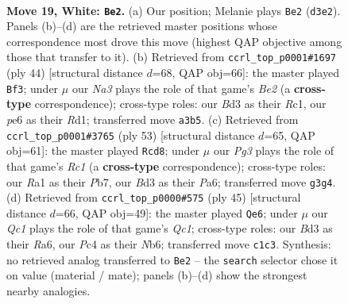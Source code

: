 \documentclass[11pt]{article}
\begin{document}
\clearpage

\begin{figure}[p]\centering
\begin{subfigure}{0.46\textwidth}\centering
\resizebox{\linewidth}{!}{%
\newchessgame
\chessboard[
  setfen={r3r1k1/pp5p/3bpqp1/3pn3/2P5/N2B2P1/PP3P1P/R1Q1R1K1 w - - 1 19},
  showmover=false,
  pgfstyle=straightmove, color=movearrow, markmove={d3-e2}
]}
\caption{}
\end{subfigure}\hfill
\begin{subfigure}{0.46\textwidth}\centering
\resizebox{\linewidth}{!}{%
\newchessgame
\chessboard[
  setfen={r2r2k1/3b1pp1/p6p/2p5/N2Pnq2/1P5P/PQ2BPP1/2RR2K1 w - - 1 23},
  showmover=false,
  pgfstyle=straightmove, color=movearrow, markmove={e2-f3}
]}
\caption{}
\end{subfigure}
\\[4pt]
\begin{subfigure}{0.46\textwidth}\centering
\resizebox{\linewidth}{!}{%
\newchessgame
\chessboard[
  setfen={2r2r1k/1pq4p/p4n2/P1p5/2B2p2/1Q2bPP1/1P2N2P/R4R1K b - - 1 27},
  showmover=false,
  pgfstyle=straightmove, color=movearrow, markmove={c8-d8}
]}
\caption{}
\end{subfigure}\hfill
\begin{subfigure}{0.46\textwidth}\centering
\resizebox{\linewidth}{!}{%
\newchessgame
\chessboard[
  setfen={2q2r1k/1pp3p1/rn5p/4bp2/P7/2NQP1P1/1B3P1P/1R2R1K1 b - - 1 23},
  showmover=false,
  pgfstyle=straightmove, color=movearrow, markmove={c8-e6}
]}
\caption{}
\end{subfigure}
\caption{\textbf{Move 19, White: \texttt{Be2}.} (a) Our position; Melanie plays \texttt{Be2} (\texttt{d3e2}). Panels (b)--(d) are the retrieved master positions whose correspondence most drove this move (highest QAP objective among those that transfer to it). (b) Retrieved from \texttt{ccrl\_top\_p0001\#1697} (ply 44) [structural distance $d$=68, QAP obj=66]: the master played \texttt{Bf3}; under $\mu$ our \emph{Na3} plays the role of that game's \emph{Be2} (a \textbf{cross-type} correspondence); cross-type roles: our \emph{B}d3 as their \emph{R}c1, our \emph{p}e6 as their \emph{R}d1; transferred move \texttt{a3b5}. (c) Retrieved from \texttt{ccrl\_top\_p0001\#3765} (ply 53) [structural distance $d$=65, QAP obj=61]: the master played \texttt{Rcd8}; under $\mu$ our \emph{Pg3} plays the role of that game's \emph{Rc1} (a \textbf{cross-type} correspondence); cross-type roles: our \emph{R}a1 as their \emph{P}b7, our \emph{B}d3 as their \emph{P}a6; transferred move \texttt{g3g4}. (d) Retrieved from \texttt{ccrl\_top\_p0000\#575} (ply 45) [structural distance $d$=66, QAP obj=49]: the master played \texttt{Qe6}; under $\mu$ our \emph{Qc1} plays the role of that game's \emph{Qc1}; cross-type roles: our \emph{B}d3 as their \emph{R}a6, our \emph{P}c4 as their \emph{N}b6; transferred move \texttt{c1c3}. Synthesis: no retrieved analog transferred to \texttt{Be2} -- the \texttt{search} selector chose it on value (material / mate); panels (b)--(d) show the strongest nearby analogies.}
\label{fig:thought-m36}
\end{figure}
\end{document}

